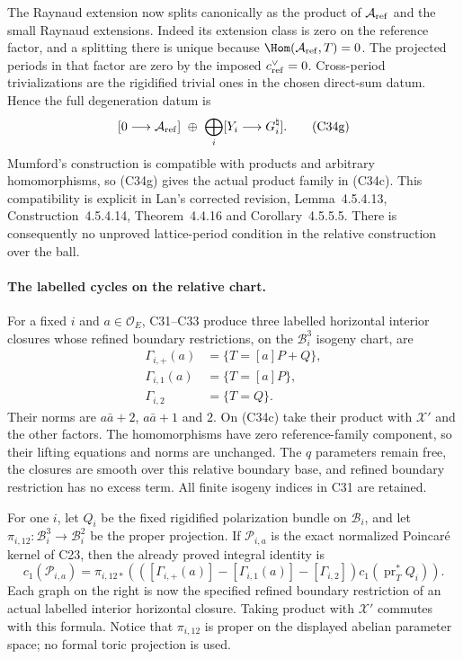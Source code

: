 The Raynaud extension now splits
canonically as the product of
$\mathcal A_{\rm ref}$ and the small
Raynaud extensions. Indeed its extension
class is zero on the reference factor,
and a splitting there is unique because
$\Hom(\mathcal A_{\rm ref},T)=0$.
The projected periods in that factor
are zero by the imposed
$c^\vee_{\rm ref}=0$. Cross-period
trivializations are the rigidified
trivial ones in the chosen direct-sum
datum. Hence the full degeneration
datum is
\[
 [0\longrightarrow\mathcal A_{\rm ref}]
       \ \oplus\ \bigoplus_i[Y_i\longrightarrow G_i^{\natural}].
                                                        \tag{C34g}
\]
Mumford's construction is compatible
with products and arbitrary
homomorphisms, so (C34g) gives the
actual product family in (C34c).
This compatibility is explicit in
Lan's corrected revision,
Lemma~4.5.4.13, Construction~4.5.4.14,
Theorem~4.4.16 and
Corollary~4.5.5.5. There is consequently
no unproved lattice-period condition
in the relative construction over the
ball.

\paragraph{The labelled cycles on the relative chart.}
For a fixed $i$ and $a\in\mathcal O_E$,
C31--C33 produce three labelled
horizontal interior closures whose
refined boundary restrictions, on the
$\mathcal B_i^3$ isogeny chart, are
\[
 \begin{aligned}
 \Gamma_{i,+}(a)&=\{T=[a]P+Q\},\\
 \Gamma_{i,1}(a)&=\{T=[a]P\},\\
 \Gamma_{i,2}&=\{T=Q\}.
 \end{aligned}                                         \tag{C34h}
\]
Their norms are $a\bar a+2$, $a\bar a+1$
and $2$. On (C34c) take their product
with $\mathcal X'$ and the other
factors. The homomorphisms have zero
reference-family component, so their
lifting equations and norms are
unchanged. The $q$ parameters remain
free, the closures are smooth over
this relative boundary base, and
refined boundary restriction has no
excess term. All finite isogeny
indices in C31 are retained.

For one $i$, let $Q_i$ be the fixed
rigidified polarization bundle on
$\mathcal B_i$, and let
$\pi_{i,12}:\mathcal B_i^3\to\mathcal B_i^2$
be the proper projection. If
$\mathcal P_{i,a}$ is the exact
normalized Poincar\'e kernel of C23,
then the already proved integral
identity is
\[
 c_1(\mathcal P_{i,a})=
 \pi_{i,12*}\left(
  ([\Gamma_{i,+}(a)]-[\Gamma_{i,1}(a)]-[\Gamma_{i,2}])
                         c_1(\operatorname{pr}_T^*Q_i)\right).
                                                        \tag{C34i}
\]
Each graph on the right is now the
specified refined boundary restriction
of an actual labelled interior
horizontal closure. Taking product
with $\mathcal X'$ commutes with this
formula. Notice that $\pi_{i,12}$ is
proper on the displayed abelian
parameter space; no formal toric
projection is used.

